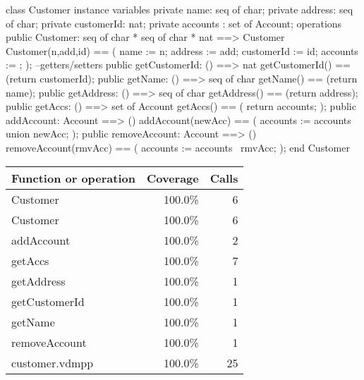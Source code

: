 \documentclass[a4paper]{article}
\begin{document}
\title{}
\author{}
\begin{vdm_al}

class Customer
instance variables
    private name: seq of char;
    private address: seq of char;
    private customerId: nat;
    private accounts : set of Account;
operations
    public Customer: seq of char * seq of char * nat ==> Customer
    Customer(n,add,id) == (
        name := n;
        address := add;
        customerId := id;
        accounts := {};
    );
    --getters/setters
    public getCustomerId: () ==> nat
    getCustomerId() == (return customerId);
    public getName: () ==> seq of char
    getName() == (return name);
    public getAddress: () ==> seq of char
    getAddress() == (return address);
    public getAccs: () ==> set of Account
    getAccs() == (
        return accounts;
    );
    public addAccount: Account ==> ()
    addAccount(newAcc) == (
        accounts := accounts union {newAcc};
    );
    public removeAccount: Account ==> ()
    removeAccount(rmvAcc) == (
        accounts := accounts \ {rmvAcc};
    );
end Customer
\end{vdm_al}
\bigskip
\begin{longtable}{|l|r|r|}
\hline
Function or operation & Coverage & Calls \\
\hline
\hline
Customer & 100.0\% & 6 \\
\hline
Customer & 100.0\% & 6 \\
\hline
addAccount & 100.0\% & 2 \\
\hline
getAccs & 100.0\% & 7 \\
\hline
getAddress & 100.0\% & 1 \\
\hline
getCustomerId & 100.0\% & 1 \\
\hline
getName & 100.0\% & 1 \\
\hline
removeAccount & 100.0\% & 1 \\
\hline
\hline
customer.vdmpp & 100.0\% & 25 \\
\hline
\end{longtable}
\end{document}
